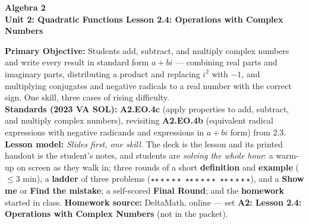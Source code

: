 \documentclass[10pt]{article}
\newcommand{\CourseName}{Algebra 2}
\newcommand{\UnitNumberName}{Unit 2: Quadratic Functions \quad}
\newcommand{\LessonNumberName}{Lesson 2.4: Operations with Complex Numbers}
\newcommand{\rung}[1]{{\color{goldacc}\ifcase#1\or$\star$\or$\star\star$\or$\star\star\star$\fi}}
\begin{document}
\begin{center}
    {\Large\bfseries \CourseName \\
    {\small\bfseries \UnitNumberName \LessonNumberName}}
\end{center}

\begin{tcolorbox}[colback=forestbg, colframe=forest, boxrule=0.9pt, arc=2mm,
    left=2mm, right=2mm, top=1.5mm, bottom=1.5mm]
    \textbf{Primary Objective:} Students add, subtract, and multiply complex numbers and write
    every result in standard form $a+bi$ --- combining real parts and imaginary parts, distributing
    a product and replacing $i^2$ with $-1$, and multiplying conjugates and negative radicals to
    a real number with the correct sign. One skill, three cases of rising difficulty.
    \\[2pt]
    \textbf{Standards (2023 VA SOL):} \textbf{A2.EO.4c} (apply properties to add, subtract, and
    multiply complex numbers), revisiting \textbf{A2.EO.4b} (equivalent radical expressions with
    negative radicands and expressions in $a+bi$ form) from 2.3.
    \\[2pt]
    \textbf{Lesson model:} \emph{Slides first, one skill.} The deck is the lesson and its printed
    handout is the student's notes, and students are \emph{solving the whole hour}: a warm-up on
    screen as they walk in; three rounds of a short \textbf{definition} and \textbf{example}
    ($\le$3 min), a \textbf{ladder} of three problems (\rung1\ \rung2\ \rung3), and a
    \textbf{Show me} or \textbf{Find the mistake}; a self-scored \textbf{Final Round}; and the
    \textbf{homework} started in class. \textbf{Homework source:} DeltaMath, online --- set
    \textbf{A2: Lesson 2.4: Operations with Complex Numbers} (not in the packet).
\end{tcolorbox}
\end{document}
